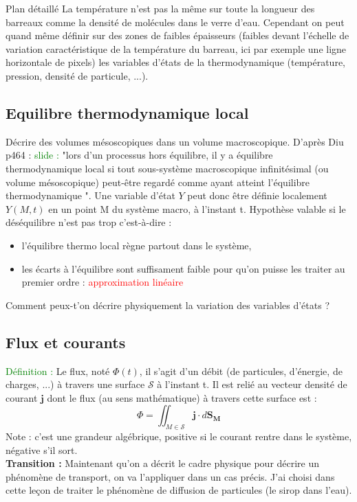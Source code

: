 \begin{reportBlock}{Plan détaillé}
La température n'est pas la même sur toute la longueur des barreaux comme la densité de molécules dans le verre d'eau. Cependant on peut quand même définir sur des zones de faibles épaisseurs (faibles devant l'échelle de variation caractéristique de la température du barreau, ici par exemple une ligne horizontale de pixels) les variables d'états de la thermodynamique (température, pression, densité de particule, ...).

\subsection{Equilibre thermodynamique local}
Décrire des volumes mésoscopiques dans un volume macroscopique. D'après Diu p464 : \textcolor{green}{slide :} "lors d'un processus hors équilibre, il y a équilibre thermodynamique local si tout sous-système macroscopique infinitésimal (ou volume mésoscopique) peut-être regardé comme ayant atteint l'équilibre thermodynamique ". Une variable d'état $Y$ peut donc être définie localement $Y(M,t)$ en un point M du système macro, à l'instant t. Hypothèse valable si le déséquilibre \og n'est pas trop \fg c'est-à-dire :
\begin{itemize}
    \item l'équilibre thermo local règne partout dans le système,
    \item les écarts à l'équilibre sont suffisament faible pour qu'on puisse les traiter au premier ordre : \textcolor{red}{approximation linéaire}
\end{itemize}

Comment peux-t'on décrire physiquement la variation des variables d'états ? 

\subsection{Flux et courants}
\textcolor{green}{Définition :} Le flux, noté $\Phi(t)$, il s'agit d'un débit (de particules, d'énergie, de charges, ...) à travers une surface $\mathcal{S}$ à l'instant t. Il est relié au vecteur densité de courant $\mathbf{j}$ dont le flux (au sens mathématique) à travers cette surface est :
\begin{equation}
    \Phi = \iint_{M\in\mathcal{S}}\mathbf{j}\cdot d\mathbf{S_M}
\end{equation}
Note : c'est une grandeur algébrique, positive si le courant rentre dans le système, négative s'il sort.\\

\textbf{Transition :} Maintenant qu'on a décrit le cadre physique pour décrire un phénomène de transport, on va l'appliquer dans un cas précis. J'ai choisi dans cette leçon de traiter le phénomène de diffusion de particules (le sirop dans l'eau).


\end{reportBlock}
